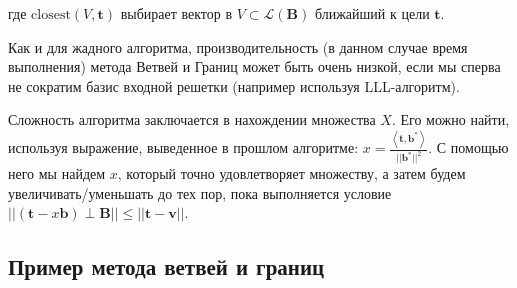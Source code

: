 



\begin{algorithmic}

\end{algorithmic}

где $ \text{closest}(V, \mathbf{t}) $ выбирает вектор в $ V \subset \mathcal{L}(\mathbf{B}) $ ближайший к цели $ \mathbf{t} $.  

Как и для жадного алгоритма, производительность (в данном случае время выполнения) метода Ветвей и Границ может быть очень низкой, если мы сперва не сократим базис входной решетки (например используя LLL-алгоритм).

Сложность алгоритма заключается в нахождении множества $ X $. Его можно найти, используя выражение, выведенное в прошлом алгоритме: $ x = \frac{\left\langle \mathbf{t},\mathbf{b}^* \right\rangle}{||\mathbf{b}^*||^2} $. С помощью него мы найдем $ x $, который точно удовлетворяет множеству, а затем будем увеличивать/уменьшать до тех пор, пока выполняется условие $ || (\mathbf{t} - x\mathbf{b}) \perp \mathbf{B} || \leq || \mathbf{t} - \mathbf{v} || $.

\subsection{Пример метода ветвей и границ}


